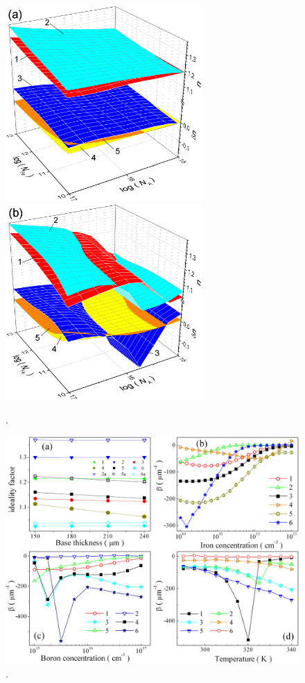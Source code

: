 ﻿\documentclass[12pt]{article}
\begin{document}
\begin{figure}
\includegraphics[width=7.5cm]{FigT290d18} \hfill
\includegraphics[width=7.5cm]{FigT340d18}
\caption{.
}
\label{FigNaNfe}
\end{figure}

\begin{figure}
\includegraphics[width=15cm]{FigTotal}
\caption{.
}
\label{FigTotal}
\end{figure}
\end{document}
